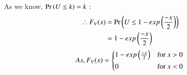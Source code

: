 \documentclass[journal,12pt,twocolumn]{IEEEtran}
\renewcommand\thesection{\arabic{section}}
\begin{document}
\begin{enumerate}[label=\thesection.\arabic*
,ref=\thesection.\theenumi]
As we know, $\Pr\left(U \le k\right) = k$ :
\begin{align*}
   \therefore F_V(x) &=  \Pr\left(U \le 1 - exp\left(\frac{-x}{2}\right)\right)\\
   &= 1 - exp\left(\frac{-x}{2}\right)
\end{align*}
\begin{equation}
    As,F_V(x) = 
    \begin{cases*}
        1 - exp\brak{\frac{-x}{2}} & for $x > 0$ \\
        0 & for $x < 0$
    \end{cases*}
\end{equation}
\end{enumerate}
\end{document}
